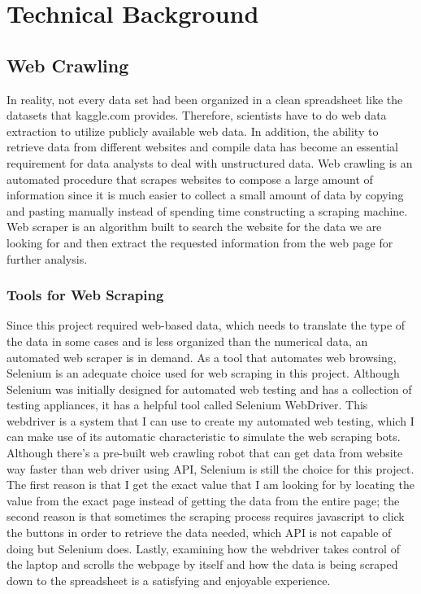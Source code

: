 \documentclass[10pt,twocolumn]{article}
\begin{document}
\section {Technical Background}

\subsection{Web Crawling}

In reality, not every data set had been organized in a clean spreadsheet like the datasets that kaggle.com provides. Therefore, scientists have to do web data extraction to utilize publicly available web data. In addition, the ability to retrieve data from different websites and compile data has become an essential requirement for data analysts to deal with unstructured data. Web crawling is an automated procedure that scrapes websites to compose a large amount of information since it is much easier to collect a small amount of data by copying and pasting manually instead of spending time constructing a scraping machine. Web scraper is an algorithm built to search the website for the data we are looking for and then extract the requested information from the web page for further analysis. 

\subsubsection{Tools for Web Scraping}
Since this project required web-based data, which needs to translate the type of the data in some cases and is less organized than the numerical data, an automated web scraper is in demand. As a tool that automates web browsing, Selenium is an adequate choice used for web scraping in this project. Although Selenium was initially designed for automated web testing and has a collection of testing appliances, it has a helpful tool called Selenium WebDriver. This webdriver is a system that I can use to create my automated web testing, which I can make use of its automatic characteristic to simulate the web scraping bots.\cite{Mitchell2015Ryan}
\newline
\indent
Although there's a pre-built web crawling robot that can get data from website way faster than web driver using API, Selenium is still the choice for this project. The first reason is that I get the exact value that I am looking for by locating the value from the exact page instead of getting the data from the entire page; the second reason is that sometimes the scraping process requires javascript to click the buttons in order to retrieve the data needed, which API is not capable of doing but Selenium does. Lastly, examining how the webdriver takes control of the laptop and scrolls the webpage by itself and how the data is being scraped down to the spreadsheet is a satisfying and enjoyable experience. 
\end{document}
